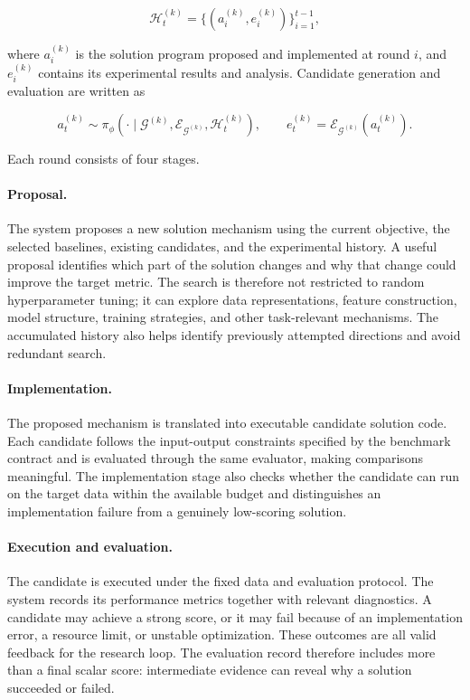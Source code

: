 \[
\mathcal{H}^{(k)}_{t}=\{(a^{(k)}_i,e^{(k)}_i)\}_{i=1}^{t-1},
\]

where $a^{(k)}_i$ is the solution program proposed and implemented at round $i$, and $e^{(k)}_i$ contains its experimental results and analysis. Candidate generation and evaluation are written as

\[
a^{(k)}_t\sim\pi_{\phi}(\cdot\mid\mathcal{G}^{(k)},\mathcal{E}_{\mathcal{G}^{(k)}},\mathcal{H}^{(k)}_t),
\qquad
e^{(k)}_t=\mathcal{E}_{\mathcal{G}^{(k)}}(a^{(k)}_t).
\]

Each round consists of four stages.

\paragraph{Proposal.}
The system proposes a new solution mechanism using the current objective, the selected baselines, existing candidates, and the experimental history. A useful proposal identifies which part of the solution changes and why that change could improve the target metric. The search is therefore not restricted to random hyperparameter tuning; it can explore data representations, feature construction, model structure, training strategies, and other task-relevant mechanisms. The accumulated history also helps identify previously attempted directions and avoid redundant search.

\paragraph{Implementation.}
The proposed mechanism is translated into executable candidate solution code. Each candidate follows the input-output constraints specified by the benchmark contract and is evaluated through the same evaluator, making comparisons meaningful. The implementation stage also checks whether the candidate can run on the target data within the available budget and distinguishes an implementation failure from a genuinely low-scoring solution.

\paragraph{Execution and evaluation.}
The candidate is executed under the fixed data and evaluation protocol. The system records its performance metrics together with relevant diagnostics. A candidate may achieve a strong score, or it may fail because of an implementation error, a resource limit, or unstable optimization. These outcomes are all valid feedback for the research loop. The evaluation record therefore includes more than a final scalar score: intermediate evidence can reveal why a solution succeeded or failed.


